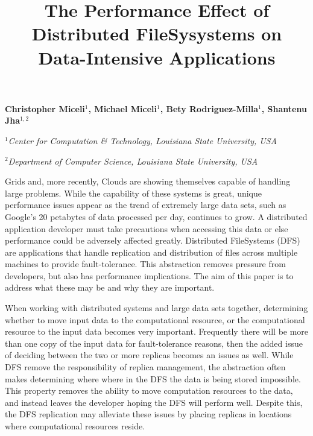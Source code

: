 \documentclass[a4paper,11pt]{article}
\newcommand{\jhanote}[1]{ {\textcolor{red} { ***Jha: #1 }}}
\newcommand{\jhanote}[1]{}
\begin{document}
\title{\large The Performance Effect of Distributed FileSysystems on Data-Intensive Applications}

\textbf{Christopher Miceli$^{1}$, Michael Miceli$^{1}$, Bety Rodriguez-Milla$^{1}$, Shantenu Jha$^{1,2}$}

\small{\emph{$^{1}$Center for Computation \& Technology, Louisiana State University, USA}}

\small{\emph{$^{2}$Department of Computer Science, Louisiana State University, USA}}


Grids and, more recently, Clouds are showing themselves capable of handling large problems. While the capability of these systems is great, unique performance issues appear as the trend of extremely large data sets, such as Google's 20 petabytes of data processed per day, continues to grow. A distributed application developer must take precautions when accessing this data or else performance could be adversely affected greatly. Distributed FileSystems (DFS) are applications that handle replication and distribution of files across multiple machines to provide fault-tolerance. This abstraction removes pressure from developers, but also has performance implications. The aim of this paper is to address what these may be and why they are important.

When working with distributed systems and large data sets together, determining whether to move input data to the computational resource, or the computational resource to the input data becomes very important. Frequently there will be more than one copy of the input data for fault-tolerance reasons, then the added issue of deciding between the two or more replicas becomes an issues as well. While DFS remove the responsibility of replica management, the abstraction often makes determining where where in the DFS the data is being stored impossible. This property removes the ability to move computation resources to the data, and instead leaves the developer hoping the DFS will perform well. Despite this, the DFS replication may alleviate these issues by placing replicas in locations where computational resources reside.

\end{document}
